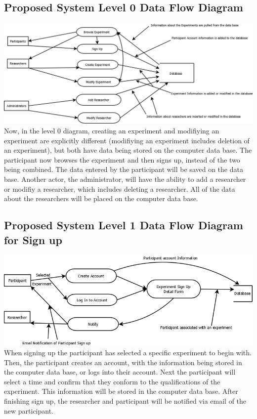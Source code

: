 \subsection{Proposed System Level 0 Data Flow Diagram}
\includegraphics[width=6in]{../other/data-flow-diagrams/new_system_level_0.png}\\
Now, in the level 0 diagram, creating an experiment and modifiying an experiment are explicitly different (modifiying an experiment includes deletion of an experiment), but both have data being stored on the computer data base.  The participant now browses the experiment and then signs up, instead of the two being combined.  The data entered by the participant will be saved on the data base.  Another actor, the administrator, will have the ability to add a researcher or modifiy a researcher, which includes deleting a researcher.  All of the data about the researchers will be placed on the computer data base.

\subsection{Proposed System Level 1 Data Flow Diagram for Sign up}
\includegraphics[width=6in]{../other/data-flow-diagrams/new_system_level_21.png}
When signing up the participant has selected a specific experiment to begin with.  Then, the participant creates an account, with the information being stored in the computer data base, or logs into their account.  Next the participant will select a time and confirm that they conform to the qualifications of the experiment.  This information will be stored in the computer data base.  After finishing sign up, the researcher and participant will be notified via email of the new participant.
